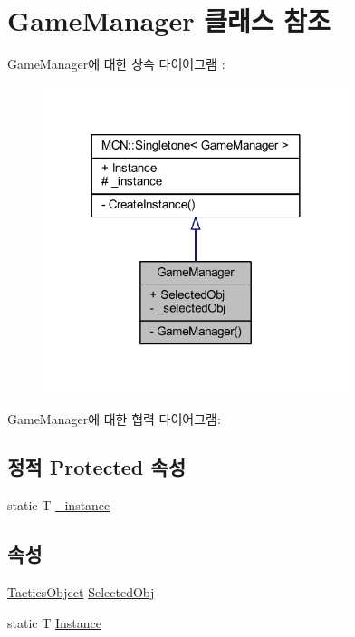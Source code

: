 \hypertarget{class_game_manager}{}\section{Game\+Manager 클래스 참조}
\label{class_game_manager}


Game\+Manager에 대한 상속 다이어그램 \+: \nopagebreak
\begin{figure}[H]
\begin{center}
\leavevmode
\includegraphics[width=252pt]{class_game_manager__inherit__graph}
\end{center}
\end{figure}


Game\+Manager에 대한 협력 다이어그램\+:
\subsection*{정적 Protected 속성}
\begin{DoxyCompactItemize}
\item 
static T \hyperlink{class_m_c_n_1_1_singletone_a267e8a9e6e7c073b988cda4f95e26eb1}{\+\_\+instance}
\end{DoxyCompactItemize}
\subsection*{속성}
\begin{DoxyCompactItemize}
\item 
\hyperlink{class_tactics_object}{Tactics\+Object} \hyperlink{class_game_manager_a708d9fb61ea9f34e4c3a55d34c31acf2}{Selected\+Obj}
\item 
static T \hyperlink{class_m_c_n_1_1_singletone_a46dbbebd93e96a9592a9803c51f35602}{Instance}
\end{DoxyCompactItemize}
